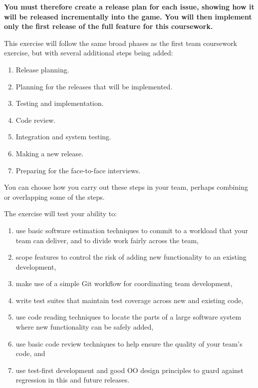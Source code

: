 \documentclass[
]{book}
\providecommand{\tightlist}{%
  \setlength{\itemsep}{0pt}\setlength{\parskip}{0pt}}
\begin{document}
\textbf{You must therefore create a release plan for each issue, showing how it will be released incrementally into the game. You will then implement only the first release of the full feature for this coursework.}

This exercise will follow the same broad phases as the first team coursework exercise, but with several additional steps being added:

\begin{enumerate}
\def\labelenumi{\arabic{enumi}.}
\tightlist
\item
  Release planning.
\item
  Planning for the releases that will be implemented.
\item
  Testing and implementation.
\item
  Code review.
\item
  Integration and system testing.
\item
  Making a new release.
\item
  Preparing for the face-to-face interviews.
\end{enumerate}

You can choose how you carry out these steps in your team, perhaps combining or overlapping some of the steps.

The exercise will test your ability to:

\begin{enumerate}
\def\labelenumi{\arabic{enumi}.}
\tightlist
\item
  use basic software estimation techniques to commit to a workload that your team can deliver, and to divide work fairly across the team,
\item
  scope features to control the risk of adding new functionality to an existing development,
\item
  make use of a simple Git workflow for coordinating team development,
\item
  write test suites that maintain test coverage across new and existing code,
\item
  use code reading techniques to locate the parts of a large software system where new functionality can be safely added,
\item
  use basic code review techniques to help ensure the quality of your team's code, and
\item
  use test-first development and good OO design principles to guard against regression in this and future releases.
\end{enumerate}
\end{document}
